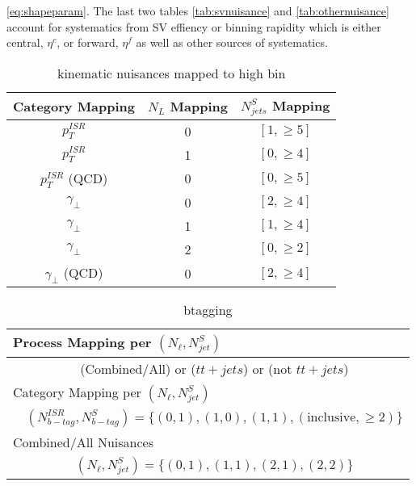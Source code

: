 \ref{eq:shapeparam}. The last two tables \ref{tab:svnuisance} and \ref{tab:othernuisance} account for systematics from SV effiency or binning rapidity which is either central, $\eta^c$, or forward, $\eta^f$ as well as other sources of systematics.

\begin{table}
\caption{kinematic nuisances mapped to high bin}
\begin{tabular}{ccc}
\hline 
Category Mapping & $N_L$ Mapping & $N_{jets}^S$  Mapping \\ 
\hline 
\hline
$p_T^{ISR}$  & 0 & $[1,\geq5]$ \\ 
$p_T^{ISR}$ & 1 & $[0,\geq4]$ \\ 
$p_T^{ISR}$ (QCD) & 0 & $[0,\geq5]$ \\ 
$\gamma_\perp$ & 0 & $[2,\geq4]$ \\ 
$\gamma_\perp$ & 1 & $[1,\geq4]$ \\ 
$\gamma_\perp$ & 2 & $[0,\geq2]$ \\  
$\gamma_\perp$ (QCD) & 0 & $[2,\geq4]$ \\ 
\hline 
\end{tabular} 
\label{tab:kinnuisance}
\end{table}


\begingroup

\begin{table}
\caption{btagging}
\setlength{\tabcolsep}{10pt} %
\renewcommand{\arraystretch}{1.5} %
\begin{tabular}{lc}

\multicolumn{2}{|l}{Process Mapping per $(N_\ell,N_{jet}^S)$ } \\ 
\hline 
 & (Combined/All) or ($tt+jets$) or (not $tt+jets$)  \\ 
\multicolumn{2}{|l}{Category Mapping per $(N_\ell,N_{jet}^S)$ } \\ 
\hline 
 & $(N_{b-tag}^{ISR},N_{b-tag}^S)=\{(0,1),(1,0),(1,1),( \text{inclusive} ,\geq2) \}$ \\ 
\multicolumn{2}{|l}{Combined/All Nuisances}  \\ 
\hline 
 & $(N_\ell,N_{jet}^S)=\{(0,1),(1,1),(2,1),(2,2) \}$ \\ 

\end{tabular} 
\label{tab:btagnuisance}
\end{table}
\endgroup

